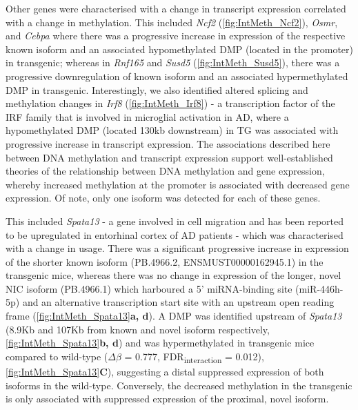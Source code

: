 Other genes were characterised with a change in transcript expression correlated with a change in methylation. This included \textit{Ncf2} (\cref{fig:IntMeth_Ncf2}), \textit{Osmr}, and \textit{Cebpa} where there was a progressive increase in expression of the respective known isoform and an associated hypomethylated DMP (located in the promoter) in transgenic; whereas in \textit{Rnf165} and \textit{Susd5} (\cref{fig:IntMeth_Susd5}), there was a progressive downregulation of known isoform and an associated hypermethylated DMP in transgenic. Interestingly, we also identified altered splicing and methylation changes in \textit{Irf8} (\cref{fig:IntMeth_Irf8}) - a transcription factor of the IRF family that is involved in microglial activation in AD\cite{Zeng2017}, where a hypomethylated DMP (located 130kb downstream) in TG was associated with progressive increase in transcript expression. The associations described here between DNA methylation and transcript expression support well-established theories of the relationship between DNA methylation and gene expression, whereby increased methylation at the promoter is associated with decreased gene expression. Of note, only one isoform was detected for each of these genes.  

This included \textit{Spata13} - a gene involved in cell migration\cite{Bourbia2019} and has been reported to be upregulated in entorhinal cortex of AD patients\cite{Yan2019} - which was characterised with a change in usage. There was a significant progressive increase in expression of the shorter known isoform (PB.4966.2, ENSMUST00000162945.1) in the transgenic mice, whereas there was no change in expression of the longer, novel NIC isoform (PB.4966.1) which harboured a 5' miRNA-binding site (miR-446h-5p) and an alternative transcription start site with an upstream open reading frame (\cref{fig:IntMeth_Spata13}\textbf{a, d}). A DMP was identified upstream of \textit{Spata13} (8.9Kb and 107Kb from known and novel isoform respectively, \cref{fig:IntMeth_Spata13}\textbf{b, d}) and was hypermethylated in transgenic mice compared to wild-type ($\Delta$$\beta$ = 0.777, FDR\textsubscript{interaction} = 0.012), \cref{fig:IntMeth_Spata13}\textbf{C}), suggesting a distal suppressed expression of both isoforms in the wild-type. Conversely, the decreased methylation in the transgenic is only associated with suppressed expression of the proximal, novel isoform. 

